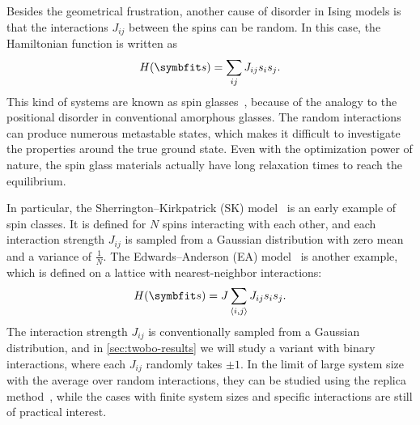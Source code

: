 Besides the geometrical frustration, another cause of disorder in Ising models is that the interactions $J_{i j}$ between the spins can be random. In this case, the Hamiltonian function is written as
\begin{equation}
H(\vs) = \sum_{i j} J_{i j} s_i s_j.
\label{eq:cl-ising-general}
\end{equation}
This kind of systems are known as spin glasses~\cite{fischer1993spin, nishimori2001statistical}, because of the analogy to the positional disorder in conventional amorphous glasses. The random interactions can produce numerous metastable states, which makes it difficult to investigate the properties around the true ground state. Even with the optimization power of nature, the spin glass materials actually have long relaxation times to reach the equilibrium.

In particular, the Sherrington--Kirkpatrick (SK) model~\cite{sherrington1975solvable} is an early example of spin classes. It is defined for $N$ spins interacting with each other, and each interaction strength $J_{i j}$ is sampled from a Gaussian distribution with zero mean and a variance of $\frac{1}{N}$. The Edwards--Anderson (EA) model~\cite{edwards1975theory} is another example, which is defined on a lattice with nearest-neighbor interactions:
\begin{equation}
H(\vs) = J \sum_{\langle i, j \rangle} J_{i j} s_i s_j.
\end{equation}
The interaction strength $J_{i j}$ is conventionally sampled from a Gaussian distribution, and in \cref{sec:twobo-results} we will study a variant with binary interactions, where each $J_{i j}$ randomly takes $\pm 1$. In the limit of large system size with the average over random interactions, they can be studied using the replica method~\cite{parisi1979infinite}, while the cases with finite system sizes and specific interactions are still of practical interest.

